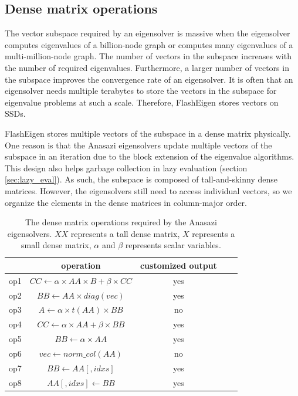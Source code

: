 \subsection{Dense matrix operations}
The vector subspace required by an eigensolver is massive when the eigensolver
computes eigenvalues of a billion-node graph or computes many eigenvalues
of a multi-million-node graph. The number of vectors in the subspace
increases with the number of required eigenvalues. Furthermore, a larger
number of vectors in the subspace improves the convergence rate of an eigensolver. 
It is often that an eigensolver needs multiple terabytes to store the vectors
in the subspace for eigenvalue problems at such a scale. Therefore, FlashEigen
stores vectors on SSDs.

FlashEigen stores multiple vectors of the subspace in a dense matrix physically.
One reason is that the Anasazi eigensolvers update multiple vectors of the subspace
in an iteration due to the block extension of the eigenvalue algorithms.
This design also helps garbage collection in lazy evaluation (section \ref{sec:lazy_eval}).
As such, the subspace is composed of tall-and-skinny dense matrices.
However, the eigensolvers still need to access individual vectors,
so we organize the elements in the dense matrices in column-major order. 

\begin{table}
	\begin{center}
		\small
		\begin{tabular}{|c|c|c|c|c|}
			\hline
			& operation & customized output \\
			\hline
			op1 & $CC \leftarrow \alpha \times AA \times B + \beta \times CC$ & yes \\
			\hline
			op2 & $BB \leftarrow AA \times diag(vec)$ & yes \\
			\hline
			op3 & $A \leftarrow \alpha \times t(AA) \times BB$ & no \\
			\hline
			op4 & $CC \leftarrow \alpha \times AA + \beta \times BB$ & yes \\
			\hline
			op5 & $BB \leftarrow \alpha \times AA$ & yes \\
			\hline
			op6 & $vec \leftarrow norm\_col(AA)$ & no \\
			\hline
			op7 & $BB \leftarrow AA[,idxs]$ & yes \\
			\hline
			op8 & $AA[,idxs] \leftarrow BB$ & yes \\
			\hline
		\end{tabular}
		\normalsize
	\end{center}
	\caption{The dense matrix operations required by the Anasazi eigensolvers.
		$XX$ represents a tall dense matrix, $X$ represents a small dense matrix,
	$\alpha$ and $\beta$ represents scalar variables.}
	\label{anasazi_ops}
\end{table}

